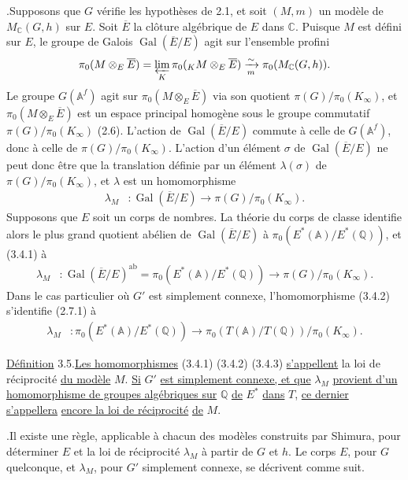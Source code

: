 \documentclass[10pt]{article}
\newcommand{\A}{\mathbb A}
\newcommand{\Af}{\mathbb A^f}
\newcommand{\C}{\mathbb C}
\newcommand{\Q}{\mathbb Q}
\newcommand{\Gal}{\operatorname{Gal}}
\newcommand{\limproj}{\varprojlim}
\newcommand{\MC}{M_{\C}}
\newcommand{\ab}{\mathrm{ab}}
\begin{document}
.\quad Supposons que $G$ vérifie les hypothèses de 2.1, et soit $(M,m)$ un modèle de $\MC(G,h)$ sur $E$. Soit $\overline E$ la clôture algébrique de $E$ dans $\C$. Puisque $M$ est défini sur $E$, le groupe de Galois $\Gal(\overline E/E)$ agit sur l'ensemble profini
\[
\pi_0(M\otimes_E\overline E)=\limproj_K\pi_0({}_K M\otimes_E\overline E)\xrightarrow[m]{\sim}\pi_0(\MC(G,h)).
\]
Le groupe $G(\Af)$ agit sur $\pi_0(M\otimes_E\overline E)$ via son quotient $\pi(G)/\pi_0(K_\infty)$, et $\pi_0(M\otimes_E\overline E)$
est un espace principal homogène sous le groupe commutatif $\pi(G)/\pi_0(K_\infty)$ (2.6). L'action de $\Gal(\overline E/E)$ commute à celle de $G(\Af)$, donc à celle de $\pi(G)/\pi_0(K_\infty)$. L'action d'un élément $\sigma$ de $\Gal(\overline E/E)$ ne peut donc être que la translation définie par un élément $\lambda(\sigma)$ de $\pi(G)/\pi_0(K_\infty)$, et $\lambda$ est un homomorphisme
\begingroup
\makeatletter
\tagsleft@true
\makeatother
\begin{align}
\lambda_M&:\Gal(\overline E/E)\longrightarrow \pi(G)/\pi_0(K_\infty). \tag{3.4.1}
\end{align}
\endgroup
Supposons que $E$ soit un corps de nombres. La théorie du corps de classe identifie alors le plus grand quotient abélien de $\Gal(\overline E/E)$ à $\pi_0(E^*(\A)/E^*(\Q))$, et (3.4.1) à
\begingroup
\makeatletter
\tagsleft@true
\makeatother
\begin{align}
\lambda_M&:\Gal(\overline E/E)^{\ab}=\pi_0(E^*(\A)/E^*(\Q))\longrightarrow\pi(G)/\pi_0(K_\infty). \tag{3.4.2}
\end{align}
\endgroup
Dans le cas particulier où $G'$ est simplement connexe, l'homomorphisme (3.4.2) s'identifie (2.7.1) à
\begingroup
\makeatletter
\tagsleft@true
\makeatother
\begin{align}
\lambda_M&:\pi_0(E^*(\A)/E^*(\Q))\longrightarrow\pi_0(T(\A)/T(\Q))/\pi_0(K_\infty). \tag{3.4.3}
\end{align}
\endgroup

\noindent\uline{Définition} 3.5.\quad \uline{Les homomorphismes} (3.4.1) (3.4.2) (3.4.3) \uline{s'appellent} la loi de réciprocité \uline{du modèle} $M$. \uline{Si} $G'$ \uline{est simplement connexe, et que} $\lambda_M$ \uline{provient d'un} \uline{homomorphisme de groupes algébriques sur} $\Q$ \uline{de} $E^*$ \uline{dans} $T$, \uline{ce dernier s'appellera} \uline{encore la \textquotedbl{}loi de réciprocité\textquotedbl{}} \uline{de} $M$.

.\quad Il existe une règle, applicable à chacun des modèles construits par Shimura, pour déterminer $E$ et la loi de réciprocité $\lambda_M$ à partir de $G$ et $h$. Le corps $E$, pour $G$ quelconque, et $\lambda_M$, pour $G'$ simplement connexe, se décrivent comme suit.
\end{document}
